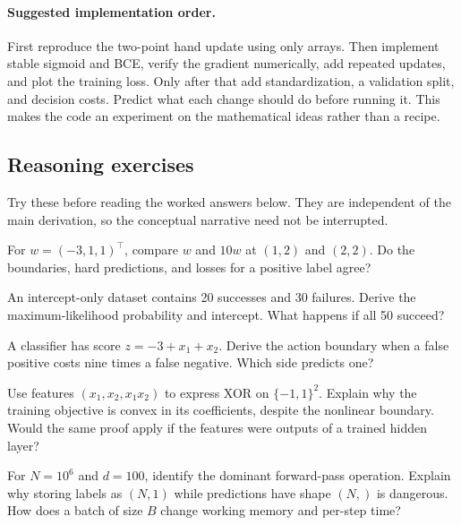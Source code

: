 \paragraph{Suggested implementation order.}
First reproduce the two-point hand update using only arrays. Then implement
stable sigmoid and BCE, verify the gradient numerically, add repeated updates,
and plot the training loss. Only after that add standardization, a validation
split, and decision costs. Predict what each change should do before running it.
This makes the code an experiment on the mathematical ideas rather than a recipe.

\subsection{Reasoning exercises}
Try these before reading the worked answers below. They are independent of the
main derivation, so the conceptual narrative need not be interrupted.
\begin{exercise}
For $w=(-3,1,1)^\top$, compare $w$ and $10w$ at $(1,2)$ and $(2,2)$.
Do the boundaries, hard predictions, and losses for a positive label agree?
\end{exercise}
\begin{exercise}
An intercept-only dataset contains 20 successes and 30 failures. Derive the
maximum-likelihood probability and intercept. What happens if all 50 succeed?
\end{exercise}
\begin{exercise}
A classifier has score $z=-3+x_1+x_2$. Derive the action boundary when a false
positive costs nine times a false negative. Which side predicts one?
\end{exercise}
\begin{exercise}
Use features $(x_1,x_2,x_1x_2)$ to express XOR on $\{-1,1\}^2$. Explain why the
training objective is convex in its coefficients, despite the nonlinear boundary.
Would the same proof apply if the features were outputs of a trained hidden layer?
\end{exercise}
\begin{exercise}
For $N=10^6$ and $d=100$, identify the dominant forward-pass operation. Explain
why storing labels as $(N,1)$ while predictions have shape $(N,)$ is dangerous.
How does a batch of size $B$ change working memory and per-step time?
\end{exercise}

